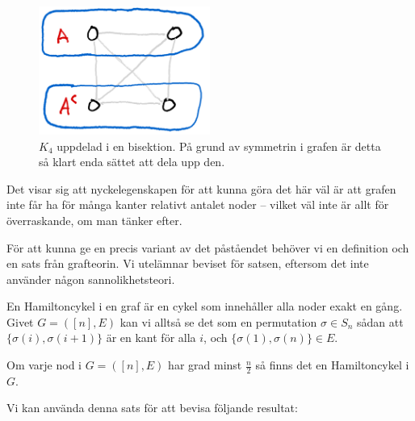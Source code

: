 \documentclass[nobib]{tufte-handout}
\begin{document}
\begin{figure}
  \centering
  \includegraphics[width=0.5\textwidth]{graphics/K4_min_bisection.png}
  \caption{$K_4$ uppdelad i en bisektion. På grund av symmetrin i grafen är detta så klart enda sättet att dela upp den.}
\end{figure}

Det visar sig att nyckelegenskapen för att kunna göra det här väl är att grafen inte får ha för många kanter relativt antalet noder -- vilket väl inte är allt för överraskande, om man tänker efter.

För att kunna ge en precis variant av det påståendet behöver vi en definition och en sats från grafteorin. Vi utelämnar beviset för satsen, eftersom det inte använder någon sannolikhetsteori.

\begin{definition}
  En Hamiltoncykel i en graf är en cykel som innehåller alla noder exakt en gång. Givet $G = ([n],E)$ kan vi alltså se det som en permutation $\sigma \in S_n$ sådan att $\{\sigma(i),\sigma(i+1)\}$ är en kant för alla $i$, och $\{\sigma(1), \sigma(n)\} \in E$.
\end{definition}

\begin{theorem}
  Om varje nod i $G = ([n], E)$ har grad minst $\frac{n}{2}$ så finns det en Hamiltoncykel i $G$.
\end{theorem}

Vi kan använda denna sats för att bevisa följande resultat:
\end{document}
